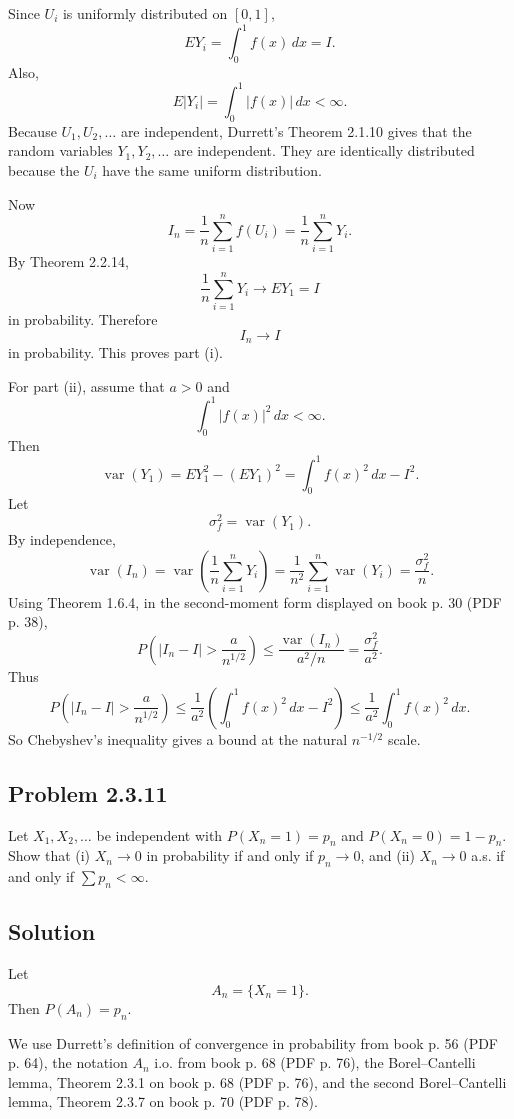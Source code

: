 \documentclass[a4paper,12pt,openany]{article}
\theoremstyle{plain}
\theoremstyle{definition}
\begin{document}
\medskip

Since $U_i$ is uniformly distributed on $[0,1]$,
\[
EY_i
=
\int_0^1 f(x)\,dx
=
I.
\]
Also,
\[
E|Y_i|
=
\int_0^1 |f(x)|\,dx
<\infty.
\]
Because $U_1,U_2,\ldots$ are independent, Durrett's Theorem 2.1.10 gives that the random variables $Y_1,Y_2,\ldots$ are independent. They are identically distributed because the $U_i$ have the same uniform distribution.

\medskip

Now
\[
I_n
=
\frac1n\sum_{i=1}^n f(U_i)
=
\frac1n\sum_{i=1}^n Y_i.
\]
By Theorem 2.2.14,
\[
\frac1n\sum_{i=1}^n Y_i
\to
EY_1
=
I
\]
in probability. Therefore
\[
I_n\to I
\]
in probability. This proves part (i).

\medskip

For part (ii), assume that $a>0$ and
\[
\int_0^1 |f(x)|^2\,dx<\infty.
\]
Then
\[
\operatorname{var}(Y_1)
=
EY_1^2-(EY_1)^2
=
\int_0^1 f(x)^2\,dx-I^2.
\]
Let
\[
\sigma_f^2=\operatorname{var}(Y_1).
\]
By independence,
\[
\operatorname{var}(I_n)
=
\operatorname{var}\left(\frac1n\sum_{i=1}^n Y_i\right)
=
\frac{1}{n^2}\sum_{i=1}^n\operatorname{var}(Y_i)
=
\frac{\sigma_f^2}{n}.
\]
Using Theorem 1.6.4, in the second-moment form displayed on book p. 30 (PDF p. 38),
\[
P\left(|I_n-I|>\frac{a}{n^{1/2}}\right)
\le
\frac{\operatorname{var}(I_n)}{a^2/n}
=
\frac{\sigma_f^2}{a^2}.
\]
Thus
\[
P\left(|I_n-I|>\frac{a}{n^{1/2}}\right)
\le
\frac{1}{a^2}
\left(\int_0^1 f(x)^2\,dx-I^2\right)
\le
\frac{1}{a^2}\int_0^1 f(x)^2\,dx.
\]
So Chebyshev's inequality gives a bound at the natural $n^{-1/2}$ scale.

\subsection*{Problem 2.3.11}

Let $X_1,X_2,\ldots$ be independent with $P(X_n = 1) = p_n$ and $P(X_n = 0) = 1 - p_n$. Show that (i) $X_n \to 0$ in probability if and only if $p_n \to 0$, and (ii) $X_n \to 0$ a.s. if and only if $\sum p_n < \infty$.

\subsection*{Solution}

Let
\[
A_n=\{X_n=1\}.
\]
Then $P(A_n)=p_n$.

We use Durrett's definition of convergence in probability from book p. 56 (PDF p. 64), the notation $A_n$ i.o. from book p. 68 (PDF p. 76), the Borel--Cantelli lemma, Theorem 2.3.1 on book p. 68 (PDF p. 76), and the second Borel--Cantelli lemma, Theorem 2.3.7 on book p. 70 (PDF p. 78).
\end{document}
